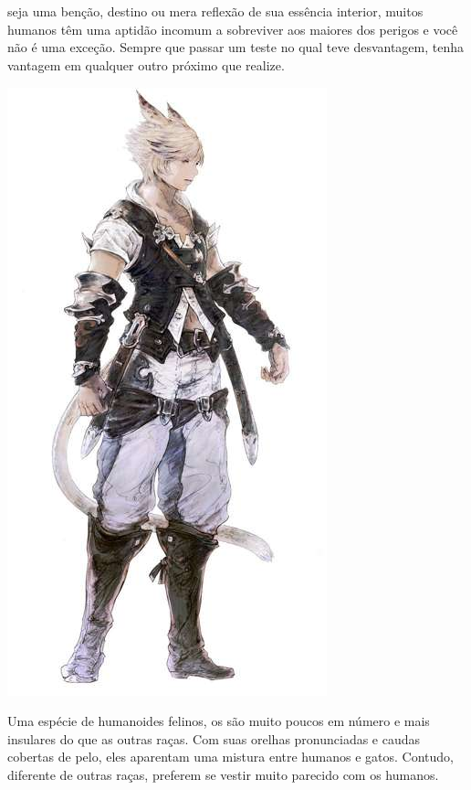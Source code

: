 \\\\
 seja uma benção, destino ou mera reflexão de sua essência interior, muitos humanos têm uma aptidão incomum a sobreviver aos maiores dos perigos e você não é uma exceção. Sempre que passar um teste no qual teve desvantagem, tenha vantagem em qualquer outro próximo que realize.
%
\pagebreak\\
%
%
\begin{center} \includegraphics[width=0.7\columnwidth]{./art/races/miqote.jpg} \end{center}
%
Uma espécie de humanoides felinos, os  são muito poucos em número e mais insulares do que as outras raças.
Com suas orelhas pronunciadas e caudas cobertas de pelo, eles aparentam uma mistura entre humanos e gatos.
Contudo, diferente de outras raças, preferem se vestir muito parecido com os humanos.
